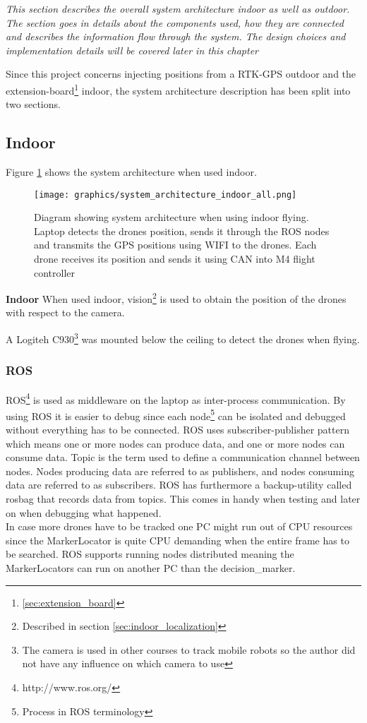 \textit{This section describes the overall system architecture indoor as well as outdoor. The section goes in details about the components used, how they are connected and describes the information flow through the system. The design choices and implementation details will be covered later in this chapter}

Since this project concerns injecting positions from a RTK-GPS outdoor and the extension-board\footnote{\ref{sec:extension_board}} indoor, the system architecture description has been split into two sections.

\subsection{Indoor} \label{sec:system_architecture_indoor}
Figure \ref{fig:indoor_information_flow} shows the system architecture when used indoor.
\begin{figure}[H]
    \center
    \texttt{[image: graphics/system\_architecture\_indoor\_all.png]}
    \caption{Diagram showing system architecture when using indoor flying. Laptop detects the drones position, sends it through the ROS nodes and transmits the GPS positions using WIFI to the drones. Each drone receives its position and sends it using CAN into M4 flight controller}
    \label{fig:indoor_information_flow}
\end{figure}

\textbf{Indoor}
When used indoor, vision\footnote{ Described in section \ref{sec:indoor_localization}} is used to obtain the position of the drones with respect to the camera. 

A Logiteh C930\footnote{The camera is used in other courses to track mobile robots so the author did not have any influence on which camera to use} was mounted below the ceiling to detect the drones when flying.


\subsubsection*{ROS}
ROS\footnote{http://www.ros.org/} is used as middleware on the laptop as inter-process communication. By using ROS it is easier to debug since each node\footnote{Process in ROS terminology} can be isolated and debugged without everything has to be connected. ROS uses subscriber-publisher pattern which means one or more nodes can produce data, and one or more nodes can consume data. Topic is the term used to define a communication channel between nodes. Nodes producing data are referred to as publishers, and nodes consuming data are referred to as subscribers. ROS has furthermore a backup-utility called rosbag that records data from topics. This comes in handy when testing and later on when debugging what happened. \\
In case more drones have to be tracked one PC might run out of CPU resources since the MarkerLocator is quite CPU demanding when the entire frame has to be searched. ROS supports running nodes distributed meaning the MarkerLocators can run on another PC than the decision\_marker.


